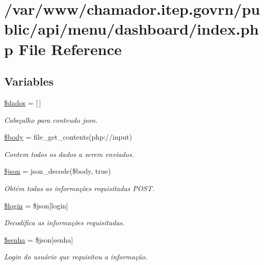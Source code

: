 \hypertarget{menu_2dashboard_2index_8php}{}\section{/var/www/chamador.itep.\+govrn/public/api/menu/dashboard/index.php File Reference}
\label{menu_2dashboard_2index_8php}
\subsection*{Variables}
\begin{DoxyCompactItemize}
\item 
\hyperlink{menu_2dashboard_2index_8php_a252370d95039a38fa11afab784725d58}{\$dados} = \mbox{[}$\,$\mbox{]}
\begin{DoxyCompactList}\small\item\em Cabeçalho para conteudo json. \end{DoxyCompactList}\item 
\hyperlink{menu_2dashboard_2index_8php_a26b9f9373f7bb79dfcf8a86dff086b45}{\$body} = file\+\_\+get\+\_\+contents(\textquotesingle{}php\+://input\textquotesingle{})
\begin{DoxyCompactList}\small\item\em Contem todos os dados a serem enviados. \end{DoxyCompactList}\item 
\hyperlink{menu_2dashboard_2index_8php_acedd13b51401130848ce18f4d5c52605}{\$json} = json\+\_\+decode(\$body, true)
\begin{DoxyCompactList}\small\item\em Obtém todas as informações requisitadas P\+O\+ST. \end{DoxyCompactList}\item 
\hyperlink{menu_2dashboard_2index_8php_afc31993e855f9631572adfedcfe6f34b}{\$login} = \$json\mbox{[}\textquotesingle{}login\textquotesingle{}\mbox{]}
\begin{DoxyCompactList}\small\item\em Decodifica as informações requisitadas. \end{DoxyCompactList}\item 
\hyperlink{menu_2dashboard_2index_8php_a3678c8769c9698fd30581c1016c5f475}{\$senha} = \$json\mbox{[}\textquotesingle{}senha\textquotesingle{}\mbox{]}
\begin{DoxyCompactList}\small\item\em Login do usuário que requisitou a informação. \end{DoxyCompactList}\item 

\end{DoxyCompactItemize}
